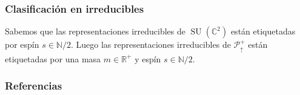 \documentclass{beamer}
\DeclareMathOperator{\SU}{SU}
\begin{document}
\begin{frame}
\frametitle{Clasificación en irreducibles}
Sabemos que las representaciones irreducibles de $\SU(\mathbb{C}^2)$ están etiquetadas por espín $s\in\mathbb{N}/2$\cite{Hall2013}. Luego las representaciones irreducibles de $\mathcal{P}^+_\uparrow$ están etiquetadas por una masa $m\in\mathbb{R}^+$ y espín $s\in\mathbb{N}/2$.
\end{frame}

\begin{frame}
\frametitle{Referencias}


\end{frame}
\end{document}
